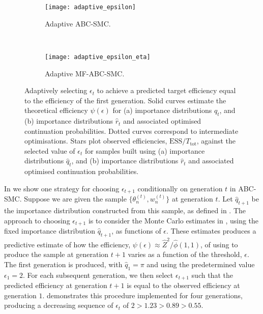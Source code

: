 \documentclass[12pt, onecolumn]{article}
\begin{document}
\begin{figure}
\centering
\begin{subfigure}[b]{0.48\textwidth}
 \texttt{[image: adaptive\_epsilon]}
 \caption{Adaptive ABC-SMC.}
 \label{fig:adaptive_epsilon}
\end{subfigure}
~
\begin{subfigure}[b]{0.48\textwidth}
 \texttt{[image: adaptive\_epsilon\_eta]}
 \caption{Adaptive MF-ABC-SMC.}
 \label{fig:adaptive_epsilon_eta}
\end{subfigure}
\caption{
Adaptively selecting $\epsilon_t$ to achieve a predicted target efficiency equal to the efficiency of the first generation. 
Solid curves estimate the theoretical efficiency $\psi(\epsilon)$ for (a) importance distributions $\hat q_t$, and (b) importance distributions $\hat r_t$ and associated optimised continuation probabilities.
Dotted curves correspond to intermediate optimisations.
Stars plot observed efficiencies, $\mathrm{ESS}/T_{\mathrm{tot}}$, against the selected value of $\epsilon_t$ for samples built using (a) importance distributions $\hat q_t$, and (b) importance distributions $\hat r_t$ and associated optimised continuation probabilities.
}
\label{fig:adaptive}
\end{figure}

In  we show one strategy for choosing $\epsilon_{t+1}$ conditionally on generation $t$ in ABC-SMC.
Suppose we are given the sample $\{ \theta_n^{(t)}, w_n^{(t)} \}$ at generation $t$.
Let $\hat q_{t+1}$ be the importance distribution constructed from this sample, as defined in .
The approach to choosing $\epsilon_{t+1}$ is to consider the Monte Carlo estimates in , using the fixed importance distribution $\hat q_{t+1}$, as functions of $\epsilon$.
These estimates produces a predictive estimate of how the efficiency, $\psi(\epsilon) \approx \hat Z^2 / \hat \phi(1,1)$, of using  to produce the sample at generation $t+1$ varies as a function of the threshold, $\epsilon$.
The first generation is produced, with $\hat q_1 = \pi$ and using the predetermined value $\epsilon_1 = 2$.
For each subsequent generation, we then select $\epsilon_{t+1}$ such that the predicted efficiency at generation $t+1$ is equal to the observed efficiency at generation $1$.
 demonstrates this procedure implemented for four generations, producing a decreasing sequence of $\epsilon_t$ of $2 > 1.23 > 0.89 > 0.55$.
\end{document}
